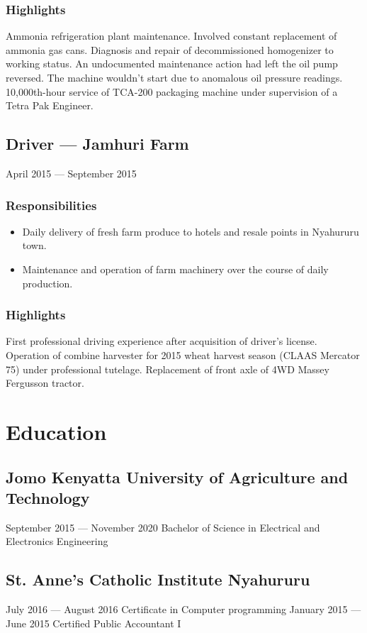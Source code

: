\documentclass[a4paper]{article}
\begin{document}
\subsubsection{Highlights}
Ammonia refrigeration plant maintenance. Involved constant replacement of ammonia gas cans.
Diagnosis and repair of decommissioned homogenizer to working status. An undocumented maintenance action had left the oil pump reversed. The machine wouldn't start due to anomalous oil pressure readings.
10,000th-hour service of TCA-200 packaging machine under supervision of a Tetra Pak Engineer.

\subsection{Driver --- Jamhuri Farm}
April 2015 --- September 2015
\subsubsection{Responsibilities}
\begin{itemize}
	\item Daily delivery of fresh farm produce to hotels and resale points in Nyahururu town.
	\item Maintenance and operation of farm machinery over the course of daily production.
\end{itemize}
\subsubsection{Highlights}
First professional driving experience after acquisition of driver's license.
Operation of combine harvester for 2015 wheat harvest season (CLAAS Mercator 75) under professional tutelage.
Replacement of front axle of 4WD Massey Fergusson tractor.

\section{Education}
\subsection{Jomo Kenyatta University of Agriculture and Technology}
September 2015 --- November 2020
Bachelor of Science in Electrical and Electronics Engineering
\subsection{St. Anne's Catholic Institute Nyahururu}
July 2016 --- August 2016
Certificate in Computer programming
January 2015 --- June 2015
Certified Public Accountant I
\end{document}

